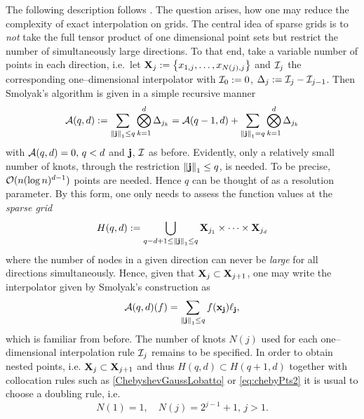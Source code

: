 \documentclass[12pt, oneside]{amsart}
\theoremstyle{definition}
\theoremstyle{remark}
\numberwithin{equation}{section}
\begin{document}
The following description follows \cite{BarthelmannHighDim_2000}.
The question arises, how one may reduce the complexity of exact interpolation 
on grids. The central idea of sparse grids is to \emph{not} take the full 
tensor product of one dimensional point sets but restrict the number of 
simultaneously  large directions. To that end, take a variable 
number of points in each direction, i.e.\ let \(\XX_j \defn \set{x_{1, j}, 
\dots, x_{N(j), j}}\) and \(\cI_j\) the corresponding one--dimensional 
interpolator with \(\cI_0 \defn 0\), \(\Delta_j \defn \cI_j - \cI_{j-1}\). Then 
Smolyak's algorithm is given in a simple recursive manner
\begin{equation}\label{Smolyak}
    \cA(q, d) \defn \sum_{\norm[1]{\bfj} \leq q} \bigotimes_{k=1}^d \Delta_{j_k} = \cA(q-1, d)+\sum_{\norm[1]{\bfj}=q} \bigotimes_{k=1}^d \Delta_{j_k}
\end{equation}
with \(\cA(q, d) = 0,\, q < d\) and \(\bfj\), \(\cI\) as before. Evidently, only a relatively small number of knots, through the restriction \(\norm[1]{\bfj} \leq q\), is needed. To be precise, \(\cO(n (\log n)^{d-1})\) points are needed. Hence \(q\) can be thought of as a resolution parameter. By this form, one only needs to assess the function values at the \emph{sparse grid} \[
	H(q, d) \defn \bigcup_{q-d+1 \leq \norm[1]{\bfj} \leq q} \XX_{j_1} \times \cdots \times \XX_{j_d}
\]
where the number of nodes in a given direction can never be \emph{large} for all directions simultaneously. Hence, given that \(\XX_j \subset \XX_{j+1}\), one may write the interpolator given by Smolyak's construction as \[
	\cA(q, d)(f) = \sum_{\norm[1]{\bfj} \leq q} f(\bfx_\bfj) \ell_\bfj,
\]
which is familiar from before.
The number of knots \(N(j)\) used for each one--dimensional interpolation rule \(\cI_j\) remains to be specified. In order to obtain nested points, i.e. \(\XX_j \subset \XX_{j+1}\) and thus \(H(q, d) \subset H(q+1,d)\) together with collocation rules such as \cref{ChebyshevGaussLobatto} or \cref{eq:chebyPts2} it is usual to choose a doubling rule, i.e. \[
	N(1) = 1,\quad N(j) = 2^{j-1}+1,\, j > 1.
\]
\end{document}
